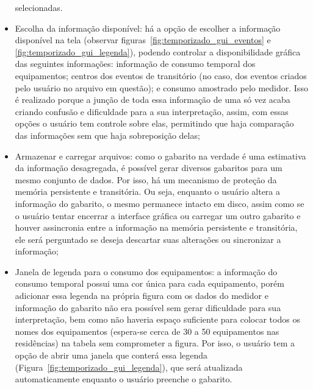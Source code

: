 \begin{itemize}
selecionadas.
\item Escolha da informação disponível: há a opção de escolher a
informação disponível na tela (observar
figuras~\ref{fig:temporizado_gui_eventos} e
\ref{fig:temporizado_gui_legenda}),
podendo controlar a disponibilidade gráfica das seguintes informações:
informação de consumo temporal dos equipamentos; centros dos eventos de
transitório (no caso, dos eventos criados pelo usuário no arquivo em
questão); e consumo amostrado pelo medidor. Isso é realizado porque a
junção de toda essa informação de uma só vez acaba criando confusão e
dificuldade para a sua interpretação, assim, com essas opções o
usuário tem controle sobre elas, permitindo que haja comparação das
informações sem que haja sobreposição delas;
\item Armazenar e carregar arquivos: como o gabarito na verdade é uma
estimativa da informação desagregada, é possível gerar diversos
gabaritos para um mesmo conjunto de dados. Por isso, há um mecanismo de
proteção da memória persistente e transitória. Ou seja, enquanto o
usuário altera a informação do gabarito, o mesmo permanece intacto em
disco, assim como se o usuário tentar encerrar a interface gráfica ou
carregar um outro gabarito e houver assincronia entre a informação
na memória persistente e transitória, ele será perguntado se deseja
descartar suas alterações ou sincronizar a informação;
\item Janela de legenda para o consumo dos equipamentos: a informação do
consumo temporal possui uma cor única para cada equipamento, porém
adicionar essa legenda na própria figura com os dados do medidor e
informação do gabarito não era possível sem gerar dificuldade para sua
interpretação, bem como não haveria espaço suficiente para colocar
todos os nomes dos equipamentos (espera-se cerca de 30 a 50 equipamentos nas
residências) na tabela sem comprometer a figura. Por isso, o usuário
tem a opção de abrir uma janela que conterá essa legenda
(Figura~\ref{fig:temporizado_gui_legenda}), que será atualizada
automaticamente enquanto o usuário preenche o gabarito.
\end{itemize}

